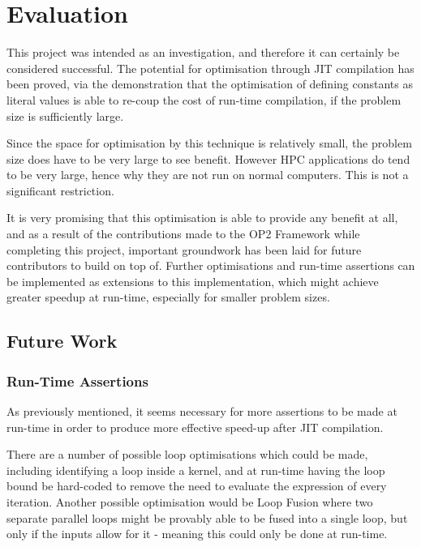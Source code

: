 
\section{Evaluation}
\label{s:eval}

This project was intended as an investigation, and therefore it can certainly be considered successful. The potential for optimisation through JIT compilation has been proved, via the demonstration that the optimisation of defining constants as literal values is able to re-coup the cost of run-time compilation, if the problem size is sufficiently large.
\par
Since the space for optimisation by this technique is relatively small, the problem size does have to be very large to see benefit. However HPC applications do tend to be very large, hence why they are not run on normal computers. This is not a significant restriction.
\par
It is very promising that this optimisation is able to provide any benefit at all, and as a result of the contributions made to the OP2 Framework while completing this project, important groundwork has been laid for future contributors to build on top of. Further optimisations and run-time assertions can be implemented as extensions to this implementation, which might achieve greater speedup at run-time, especially for smaller problem sizes.

\subsection{Future Work}
\label{ss:fw}

\subsubsection{Run-Time Assertions}
As previously mentioned, it seems necessary for more assertions to be made at run-time in order to produce more effective speed-up after JIT compilation. \par
There are a number of possible loop optimisations which could be made, including identifying a loop inside a kernel, and at run-time having the loop bound be hard-coded to remove the need to evaluate the expression of every iteration. Another possible optimisation would be Loop Fusion where two separate parallel loops might be provably able to be fused into a single loop, but only if the inputs allow for it - meaning this could only be done at run-time.

